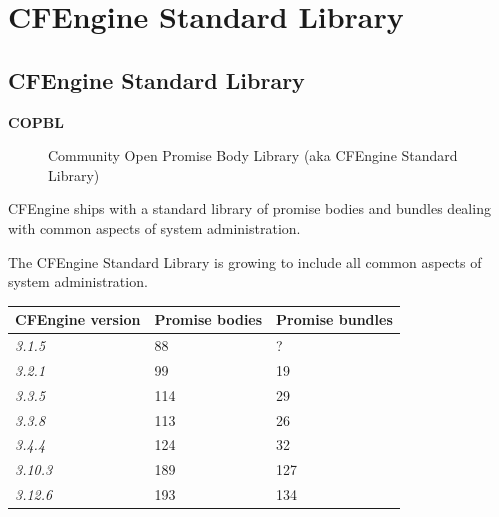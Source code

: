 



\chapter{CFEngine Standard Library}





\section{CFEngine Standard Library}

\begin{description}
\item[\textbf{COPBL}] Community Open Promise Body Library (aka CFEngine Standard Library)
\end{description}





CFEngine ships with a standard library of promise bodies and bundles
dealing with common aspects of system administration.

The CFEngine Standard Library is growing to include all common aspects
of system administration.

\begin{longtable}{|l|l|l|}
\hline
CFEngine version & Promise bodies & Promise bundles\\
\hline
\emph{3.1.5} & 88 & ?\\
\emph{3.2.1} & 99 & 19\\
\emph{3.3.5} & 114 & 29\\
\emph{3.3.8} & 113 & 26\\
\emph{3.4.4} & 124 & 32\\
\emph{3.10.3} & 189 & 127\\
\emph{3.12.6} & 193 & 134\\
\hline
\end{longtable}

